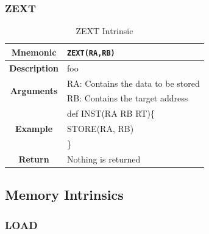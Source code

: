 \documentclass{article}
\begin{document}
\clearpage
\subsubsection{ZEXT}
\label{sec:ZEXT}

\begin{table}[h]
\begin{center}
\caption{ZEXT Intrinsic}
\vspace{0.125in}
\label{tab:ZEXTIntrinsic}
\begin{tabular}{|c|l|}
\hline
\textbf{Mnemonic} & \texttt{ZEXT(RA,RB)}\\
\hline
\textbf{Description} & foo\\
\hline
\multirow{2}{*}{\textbf{Arguments}} & RA: Contains the data to be stored\\
                          			     & RB: Contains the target address \\
\hline
\multirow{3}{*}{\textbf{Example}} & def INST(RA RB RT)\{\\
                          			  &   STORE(RA, RB)\\
                                                    & \}\\
\hline
\textbf{Return} & Nothing is returned\\                                                    
\hline
\end{tabular}
\end{center}
\end{table}

\clearpage
\subsection{Memory Intrinsics}
\label{sec:MemIntrinsics}

\subsubsection{LOAD}
\label{sec:LOAD}
\end{document}

